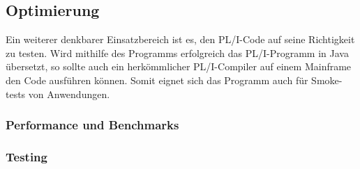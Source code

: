 	\subsection{Optimierung}
	Ein weiterer denkbarer Einsatzbereich ist es, den PL/I-Code auf seine Richtigkeit zu testen. Wird mithilfe des Programms erfolgreich das PL/I-Programm in Java übersetzt, so sollte auch ein herkömmlicher PL/I-Compiler auf einem Mainframe den Code ausführen können. Somit eignet sich das Programm auch für Smoke-tests von Anwendungen.
		\subsubsection{Performance und Benchmarks}
		\subsubsection{Testing}
